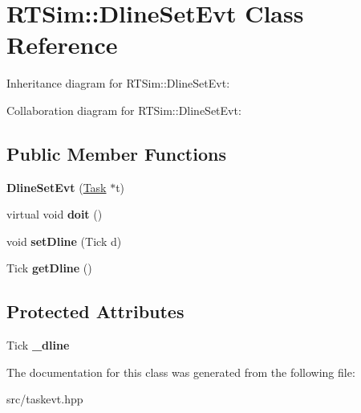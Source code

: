 \hypertarget{classRTSim_1_1DlineSetEvt}{}\section{R\+T\+Sim\+:\+:Dline\+Set\+Evt Class Reference}
\label{classRTSim_1_1DlineSetEvt}


Inheritance diagram for R\+T\+Sim\+:\+:Dline\+Set\+Evt\+:


Collaboration diagram for R\+T\+Sim\+:\+:Dline\+Set\+Evt\+:
\subsection*{Public Member Functions}
\begin{DoxyCompactItemize}
\item 
{\bfseries Dline\+Set\+Evt} (\hyperlink{classRTSim_1_1Task}{Task} $\ast$t)
\item 
virtual void {\bfseries doit} ()
\item 
void {\bfseries set\+Dline} (Tick d)
\item 
Tick {\bfseries get\+Dline} ()
\end{DoxyCompactItemize}
\subsection*{Protected Attributes}
\begin{DoxyCompactItemize}
\item 
Tick {\bfseries \+\_\+dline}
\end{DoxyCompactItemize}


The documentation for this class was generated from the following file\+:\begin{DoxyCompactItemize}
\item 
src/taskevt.\+hpp\end{DoxyCompactItemize}
